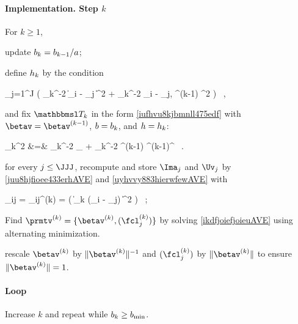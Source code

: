 \paragraph{Implementation. Step \( k \)}
For \( k \geq 1 \), 
\begin{mylist}

\item 
update \( b_{k} = b_{k-1} / a \);
\item 
define \( h_{k} \) by the condition
\begin{EQA}[c]
	 \sum_{j=1}^{J} \sumi 
		\Kern\Bigl( \hiso_{k}^{-2} \| \Xv_{i} - \xv_{j} \|^{2} + \haniso_{k}^{-2} \langle \Xv_{i} - \xv_{j}, \betav^{(k-1)} \rangle^{2} \Bigr)
	\geq 
	\nmin
	\, ,
\label{jhgiverkytde4w34etyAVE}
\end{EQA}
and fix \( \TEDR_{k} \) in the form \eqref{iufhvu8kjbmnll475edf} with \( \betav = \betav^{(k-1)} \),
\( b = b_{k} \), and \( h = h_{k} \):
\begin{EQA}[rcl]
	\TEDR_{k}^{2}
	&=&
	\hiso_{k}^{-2} \Id_{\dimd} + \haniso_{k}^{-2} \betav^{(k-1)} {\betav^{(k-1)}}^{\T}
	\, .
\label{iufhvu8kjbmnll475eAVE}
\end{EQA}

\item 
for every \( j \leq \JJJ \), recompute and store \( \Ima_{j} \) and \( \Uv_{j} \) by \eqref{juu8hjfioee433erhAVE} and \eqref{uyhvvy883hierwfewAVE}
with 
\begin{EQA}[c]
	\weight_{ij} 
	= 
	\weight_{ij}^{(k)}
	= 
	\Kern\bigl( \| \TEDR_{k} (\Xv_{i} - \xv_{j}) \|^{2} \bigr) 
	\, ;
\end{EQA}

\item 
Find \( \prmtv^{(k)} = \{ \betav^{(k)},(\fcl_{j}^{(k)}) \} \) by solving \eqref{ikdfjoiefjoieuAVE} 
 using alternating minimization.
\item 
rescale \( \betav^{(k)} \) by \( \| \betav^{(k)} \|^{-1} \) and \( (\fcl_{j}^{(k)}) \) by \( \| \betav^{(k)} \| \) to ensure 
\( \| \betav^{(k)} \| = 1 \).
\end{mylist}


\paragraph{Loop}
%
Increase \( k \) and repeat while \( b_{k} \geq b_{\min} \).


